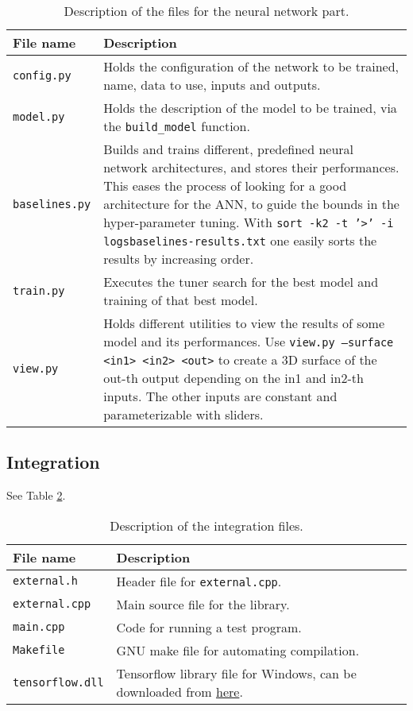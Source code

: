 \begin{table}[h]
    \centering
    \begin{tabular}{|p{}|p{}|}
        \hline
        File name & Description \\ \hline
        \texttt{config.py} & Holds the configuration of the network to be trained, name, data to use, inputs and outputs. \\
        \texttt{model.py} & Holds the description of the model to be trained, via the \texttt{build\_model} function. \\
        \texttt{baselines.py} & Builds and trains different, predefined neural network architectures, and stores their performances. This eases the process of looking for a good architecture for the ANN, to guide the bounds in the hyper-parameter tuning. With \texttt{sort -k2 -t '>' -i logs\/baselines-results.txt} one easily sorts the results by increasing order. \\
        \texttt{train.py} & Executes the tuner search for the best model and training of that best model. \\
        \texttt{view.py} & Holds different utilities to view the results of some model and its performances. Use \texttt{view.py --surface <in1> <in2> <out>} to create a 3D surface of the out-th output depending on the in1 and in2-th inputs. The other inputs are constant and parameterizable with sliders. \\
        \hline
    \end{tabular}
    \caption{Description of the files for the neural network part.}
    \label{tab:annex-files-nn}
\end{table}

\subsection*{Integration}

See Table \ref{tab:annex-files-integration}.

\begin{table}[h]
    \centering
    \begin{tabular}{|p{}|p{}|}
        \hline
        File name & Description \\ \hline
        \texttt{external.h} & Header file for \texttt{external.cpp}. \\
        \texttt{external.cpp} & Main source file for the library. \\
        \texttt{main.cpp} & Code for running a test program. \\
        \texttt{Makefile} & GNU make file for automating compilation. \\
        \texttt{tensorflow.dll} & Tensorflow library file for Windows, can be downloaded from \href{https://www.tensorflow.org/install/lang_c}{here}. \\
        \hline
    \end{tabular}
    \caption{Description of the integration files.}
    \label{tab:annex-files-integration}
\end{table}

